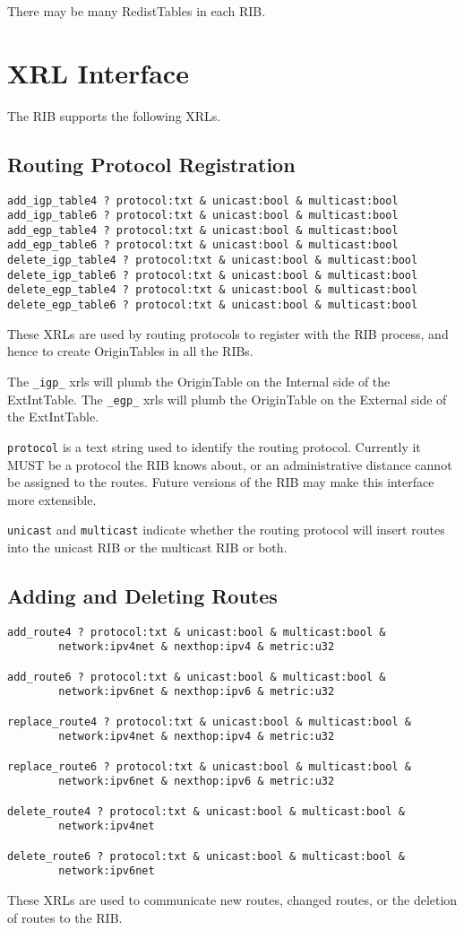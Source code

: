\documentclass[11pt]{article}
\begin{document}
There may be many RedistTables in each RIB.

\section{XRL Interface}

The RIB supports the following XRLs.
\subsection{Routing Protocol Registration}
\begin{verbatim}
add_igp_table4 ? protocol:txt & unicast:bool & multicast:bool
add_igp_table6 ? protocol:txt & unicast:bool & multicast:bool
add_egp_table4 ? protocol:txt & unicast:bool & multicast:bool
add_egp_table6 ? protocol:txt & unicast:bool & multicast:bool
delete_igp_table4 ? protocol:txt & unicast:bool & multicast:bool
delete_igp_table6 ? protocol:txt & unicast:bool & multicast:bool
delete_egp_table4 ? protocol:txt & unicast:bool & multicast:bool
delete_egp_table6 ? protocol:txt & unicast:bool & multicast:bool
\end{verbatim}
These XRLs are used by routing protocols to register with the RIB
process, and hence to create OriginTables in all the RIBs.

The {\tt \_igp\_} xrls will plumb the OriginTable on the Internal side
of the ExtIntTable.  The {\tt \_egp\_} xrls will plumb the OriginTable
on the External side of the ExtIntTable.

{\tt protocol} is a text string used to identify the routing protocol.
Currently it MUST be a protocol the RIB knows about, or an
administrative distance cannot be assigned to the routes.  Future
versions of the RIB may make this interface more extensible.

{\tt unicast} and {\tt multicast} indicate whether the routing
protocol will insert routes into the unicast RIB or the multicast RIB
or both.

\subsection{Adding and Deleting Routes}
\begin{verbatim}
add_route4 ? protocol:txt & unicast:bool & multicast:bool & 
        network:ipv4net & nexthop:ipv4 & metric:u32

add_route6 ? protocol:txt & unicast:bool & multicast:bool & 
        network:ipv6net & nexthop:ipv6 & metric:u32

replace_route4 ? protocol:txt & unicast:bool & multicast:bool & 
        network:ipv4net & nexthop:ipv4 & metric:u32

replace_route6 ? protocol:txt & unicast:bool & multicast:bool & 
        network:ipv6net & nexthop:ipv6 & metric:u32

delete_route4 ? protocol:txt & unicast:bool & multicast:bool & 
        network:ipv4net

delete_route6 ? protocol:txt & unicast:bool & multicast:bool & 
        network:ipv6net
\end{verbatim}
These XRLs are used to communicate new routes, changed routes, or the
deletion of routes to the RIB.
\end{document}
